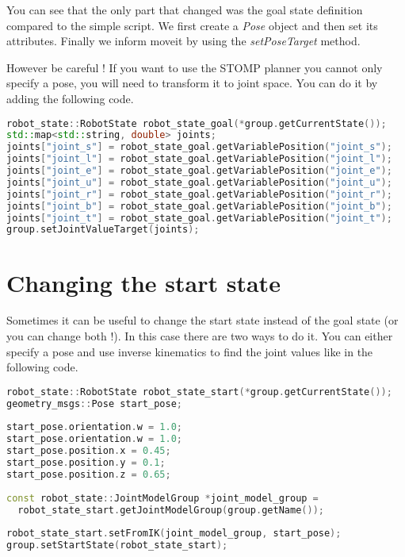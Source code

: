 

You can see that the only part that changed was the goal state definition compared to the simple script. We first create a \emph{Pose} object and then set its attributes. Finally we inform moveit by using the \emph{setPoseTarget} method. 

However be careful ! If you want to use the STOMP planner you cannot only specify a pose, you will need to transform it to joint space. You can do it by adding the following code.

\begin{lstlisting}[language=c++]
robot_state::RobotState robot_state_goal(*group.getCurrentState());
std::map<std::string, double> joints;
joints["joint_s"] = robot_state_goal.getVariablePosition("joint_s");
joints["joint_l"] = robot_state_goal.getVariablePosition("joint_l");
joints["joint_e"] = robot_state_goal.getVariablePosition("joint_e");
joints["joint_u"] = robot_state_goal.getVariablePosition("joint_u");
joints["joint_r"] = robot_state_goal.getVariablePosition("joint_r");
joints["joint_b"] = robot_state_goal.getVariablePosition("joint_b");
joints["joint_t"] = robot_state_goal.getVariablePosition("joint_t");
group.setJointValueTarget(joints);
\end{lstlisting}

\section{Changing the start state}
Sometimes it can be useful to change the start state instead of the goal state (or you can change both !). In this case there are two ways to do it. You can either specify a pose and use inverse kinematics to find the joint values like in the following code.
 

\begin{lstlisting}[language=c++]
robot_state::RobotState robot_state_start(*group.getCurrentState());
geometry_msgs::Pose start_pose;
  
start_pose.orientation.w = 1.0; 
start_pose.orientation.w = 1.0;
start_pose.position.x = 0.45;
start_pose.position.y = 0.1;
start_pose.position.z = 0.65;
  
const robot_state::JointModelGroup *joint_model_group =
  robot_state_start.getJointModelGroup(group.getName());
  
robot_state_start.setFromIK(joint_model_group, start_pose);
group.setStartState(robot_state_start);
\end{lstlisting}

